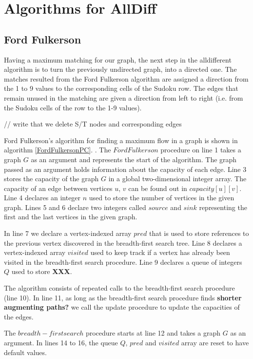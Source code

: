 \documentclass{l4proj}
\begin{document}
 
\chapter{Algorithms for AllDiff}
\section{Ford Fulkerson}
Having a maximum matching for our graph, the next step in the alldifferent algorithm is to turn the previously undirected graph, into a directed one. The matches resulted from the Ford Fulkerson algorithm are assigned a direction from the 1 to 9 values to the corresponding cells of the Sudoku row. The edges that remain unused in the matching are given a direction from left to right (i.e. from the Sudoku cells of the row to the 1-9 values).

\noindent // write that we delete S/T nodes and corresponding edges

\noindent Ford Fulkerson's algorithm for finding a maximum flow in a graph is shown in algorithm \ref{FordFulkersonPC}. \cite{ford1956maximal}. The $Ford Fulkerson$ procedure on line 1 takes a graph $G$ as an argument and represents the start of the algorithm. The graph passed as an argument holds information about the capacity of each edge. Line 3 stores the capacity of the graph $G$ in a global two-dimensional integer array. The capacity of an edge between vertices $u$, $v$ can be found out in $capacity[u][v]$. Line 4 declares an integer $n$ used to store the number of vertices in the given graph. Lines 5 and 6 declare two integers called $source$ and $sink$ representing the first and the last vertices in the given graph.

\noindent In line 7 we declare a vertex-indexed array $pred$ that is used to store references to the previous vertex discovered in the breadth-first search tree. Line 8 declares a vertex-indexed array $visited$ used to keep track if a vertex has already been visited in the breadth-first search procedure. Line 9 declares a queue of integers $Q$ used to store \textbf{XXX}.

\noindent The algorithm consists of repeated calls to the breadth-first search procedure (line 10). In line 11, as long as the breadth-first search procedure finds \textbf{shorter augmenting paths?} we call the update procedure to update the capacities of the edges.

\noindent The $breadth-first search$ procedure starts at line 12 and takes a graph $G$ as an argument. In lines 14 to 16, the queue $Q$, $pred$ and $visited$ array are reset to have default values.
\end{document}
